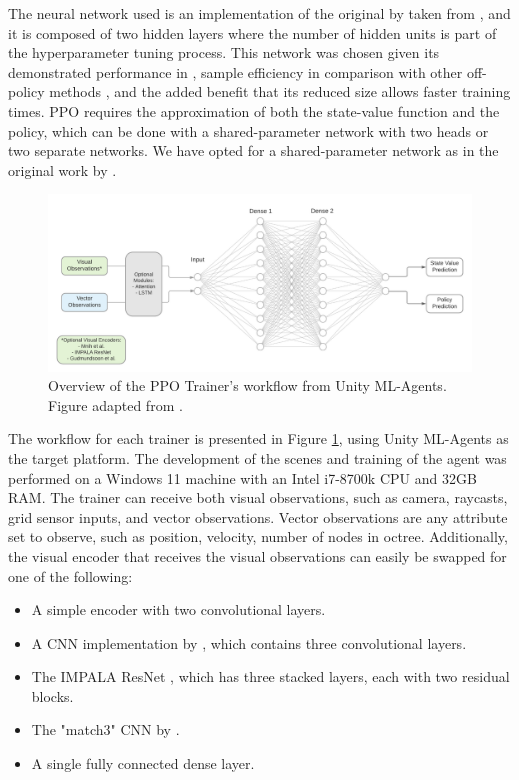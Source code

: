 The neural network used is an implementation of the original by \textcite{schulman2017proximal} taken from \cite{github-unity-mlagents-toolkit}, and it is composed of two hidden layers where the number of hidden units is part of the hyperparameter tuning process. 
This network was chosen given its demonstrated performance in \cite{mnih2015human, kempka2016vizdoom, lample2017playing}, sample efficiency in comparison with other off-policy methods \cite{yu2021surprising}, and the added benefit that its reduced size allows faster training times.
PPO requires the approximation of both the state-value function and the policy, which can be done with a shared-parameter network with two heads or two separate networks. We have opted for a shared-parameter network as in the original work by \cite{schulman2017proximal}. 

\begin{figure}[!ht]
        \centering
        \includegraphics[width=1\textwidth]{images/PPO-unity (1).png}
        \caption{Overview of the PPO Trainer's workflow from Unity ML-Agents. Figure adapted from \cite{github-unity-mlagents-toolkit}.
        }
        \label{fig:unity-drone}
\end{figure}

The workflow for each trainer is presented in Figure \ref{fig:unity-drone}, using Unity ML-Agents \cite{github-unity-mlagents-toolkit} as the target platform. The development of the scenes and training of the agent was performed on a Windows 11 machine with an Intel i7-8700k CPU and 32GB RAM.
The trainer can receive both visual observations, such as camera, raycasts, grid sensor inputs, and vector observations. Vector observations are any attribute set to observe, such as position, velocity, number of nodes in octree. Additionally, the visual encoder that receives the visual observations can easily be swapped for one of the following: 
\begin{itemize}
    \item A simple encoder with two convolutional layers.
    \item A CNN implementation by \textcite{mnih2016asynchronous}, which contains three convolutional layers.
    \item The IMPALA ResNet \cite{espeholt2018impala}, which has three stacked layers, each with two residual blocks.
    \item The "match3" CNN by \textcite{gudmundsson2018human}.
    \item A single fully connected dense layer.
\end{itemize}

